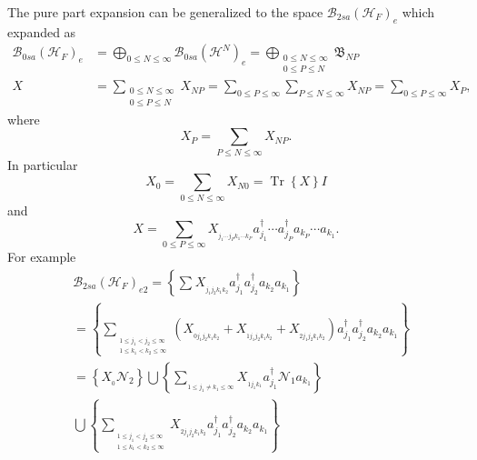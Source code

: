 \documentclass[aps,preprint]{revtex4}%
\begin{document}
The pure part expansion can be generalized to the space $\mathcal{B}%
_{2sa}\left(  \mathcal{H}_{F}\right)  _{e}$ which expanded as
\begin{align}
\mathcal{B}_{0sa}\left(  \mathcal{H}_{F}\right)  _{e}  &  =%
{\displaystyle\bigoplus\limits_{0\leq N\leq\infty}}
\mathcal{B}_{0sa}\left(  \mathcal{H}^{N}\right)  _{e}=%
{\displaystyle\bigoplus\limits_{\substack{0\leq N\leq\infty\\0\leq P\leq N}}}
\mathfrak{B}_{NP}\\
X  &  =\sum_{\substack{0\leq N\leq\infty\\0\leq P\leq N}}X_{NP}=\sum_{0\leq
P\leq\infty}\sum_{P\leq N\leq\infty}X_{NP}=\sum_{0\leq P\leq\infty}X_{P},
\end{align}
where
\begin{equation}
X_{P}=\sum_{P\leq N\leq\infty}X_{NP}.
\end{equation}
In particular
\begin{equation}
X_{0}=\sum_{0\leq N\leq\infty}X_{N0}=\operatorname*{Tr}\left\{  X\right\}  I
\end{equation}
and
\begin{equation}
X=\sum_{0\leq P\leq\infty}X_{_{j_{1}\cdots j_{P}k_{1}\cdots k_{P}}}a_{j_{1}%
}^{\dagger}\cdots a_{j_{P}}^{\dagger}a_{k_{P}}\cdots a_{k_{1}}.
\end{equation}
For example
\begin{align}
&  \mathcal{B}_{2sa}\left(  \mathcal{H}_{F}\right)  _{e2}=\left\{  \sum_{{}%
}X_{_{j_{1}j_{2}k_{1}k_{2}}}a_{j_{1}}^{\dagger}a_{j_{2}}^{\dagger}a_{k_{2}%
}a_{k_{1}}\right\} \\
&  =\left\{  \sum_{_{\substack{1\leq j_{1}<j_{2}\leq\infty\\1\leq k_{1}%
<k_{2}\leq\infty}}}\left(  X_{_{0j_{1}j_{2}k_{1}k_{2}}}+X_{_{1j_{1}j_{2}%
k_{1}k_{2}}}+X_{_{2j_{1}j_{2}k_{1}k_{2}}}\right)  a_{j_{1}}^{\dagger}a_{j_{2}%
}^{\dagger}a_{k_{2}}a_{k_{1}}\right\} \\
&  =\left\{  X_{_{0}}\mathcal{N}_{2}\right\}  \bigcup\left\{  \sum_{_{1\leq
j_{1}\neq k_{1}\leq\infty}}X_{_{1j_{1}k_{1}}}a_{j_{1}}^{\dagger}%
\mathcal{N}_{1}a_{k_{1}}\right\} \\
&  \bigcup\left\{  \sum_{_{\substack{1\leq j_{1}<j_{2}\leq\infty\\1\leq
k_{1}<k_{2}\leq\infty}}}X_{_{2j_{1}j_{2}k_{1}k_{2}}}a_{j_{1}}^{\dagger
}a_{j_{2}}^{\dagger}a_{k_{2}}a_{k_{1}}\right\}
\end{align}
\end{document}
